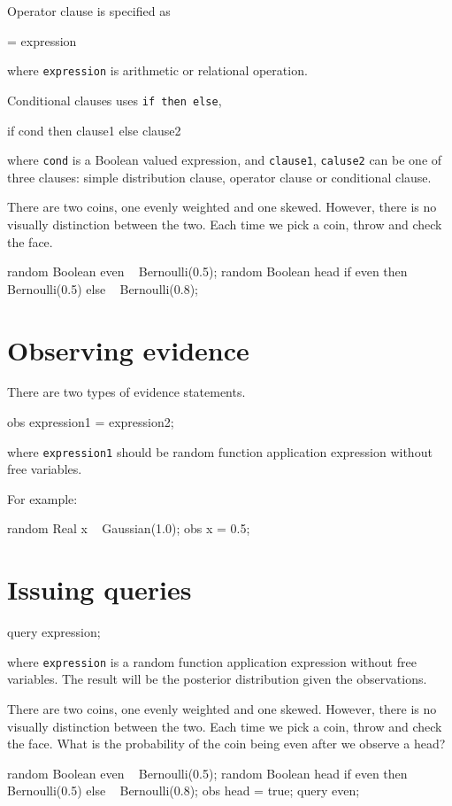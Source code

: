 \documentclass[12pt]{article}
\begin{document}
Operator clause is specified as
\begin{blogcode}
= expression
\end{blogcode}
where \texttt{expression} is arithmetic or relational operation. 

Conditional clauses uses \texttt{if then else}, 
\begin{blogcode}
if cond then clause1
else clause2
\end{blogcode}
where \texttt{cond} is a Boolean valued expression, and \texttt{clause1}, \texttt{caluse2} can be one of three clauses: simple distribution clause, operator clause or conditional clause. 

\begin{example}
There are two coins, one evenly weighted and one skewed. However, there is no visually distinction between the two. Each time we pick a coin, throw and check the face.
\end{example}
\begin{blogcode}
random Boolean even ~ Bernoulli(0.5);
random Boolean head 
  if even then ~ Bernoulli(0.5)
  else ~ Bernoulli(0.8);
\end{blogcode}

\section{Observing evidence}
There are two types of evidence statements.
\begin{blogcode}
obs expression1 = expression2;
\end{blogcode}
where \texttt{expression1} should be random function application expression without free variables. 

For example:
\begin{blogcode}
random Real x ~ Gaussian(1.0);
obs x = 0.5;
\end{blogcode}

\section{Issuing queries}
\begin{blogcode}
query expression;
\end{blogcode}
where \texttt{expression} is a random function application expression without free variables. The result will be the posterior distribution given the observations. 

\begin{example}
There are two coins, one evenly weighted and one skewed. However, there is no visually distinction between the two. Each time we pick a coin, throw and check the face. What is the probability of the coin being even after we observe a head?
\end{example}
\begin{blogcode}
random Boolean even ~ Bernoulli(0.5);
random Boolean head 
  if even then ~ Bernoulli(0.5)
  else ~ Bernoulli(0.8);
obs head = true;
query even;
\end{blogcode}
\end{document}
